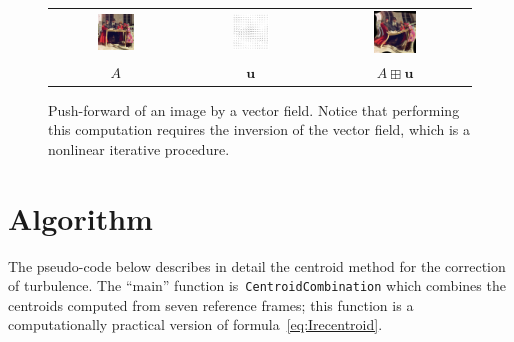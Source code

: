 \documentclass{ipol}
\def\u{\mathbf{u}}
\begin{document}
\begin{figure}[h]
	\begin{center}
		\begin{tabular}{ccc}
			\includegraphics[width=0.3\textwidth]{f/samarkand.png} &
			\includegraphics[width=0.3\textwidth]{f/deformation.png} &
			\includegraphics[width=0.3\textwidth]{f/deforkand.png} \\
			$A$ & $\u$ & $A\boxplus\u$ \\
		\end{tabular}
	\end{center}
	\caption{
	Push-forward of an image by a vector field.
	Notice that performing this computation requires the inversion of the vector
	field, which is a nonlinear iterative procedure.
	}
	\label{fig:pushforward}
\end{figure}

\section{Algorithm}

The pseudo-code below describes in detail the centroid method for the
correction of turbulence.  The ``main'' function
is~\texttt{CentroidCombination} which combines the centroids computed from
seven reference frames; this function is a computationally practical version
of formula~\ref{eq:Irecentroid}.
\end{document}
